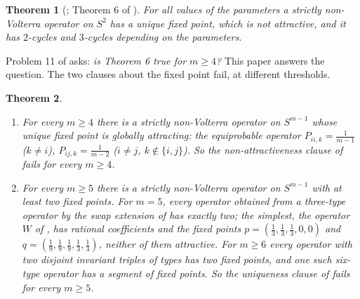 \documentclass[11pt]{amsart}
\newtheorem{theorem}{Theorem}[section]
\theoremstyle{definition}
\newcommand{\Simp}{S^{m-1}}
\begin{document}
\begin{theorem}[{\cite{RZ09}; Theorem 6 of \cite{GR09}}]\label{thm:six}
For all values of the parameters a strictly non-Volterra operator on $S^2$ has a unique fixed point, which is not attractive, and it has $2$-cycles and $3$-cycles depending on the parameters.
\end{theorem}

Problem 11 of \cite{GR09} asks: \emph{is Theorem 6 true for $m\ge4$?} This paper answers the question. The two clauses about the fixed point fail, at different thresholds.

\begin{theorem}\label{thm:main}
\leavevmode
\begin{enumerate}
\item[(i)] For every $m\ge4$ there is a strictly non-Volterra operator on $\Simp$ whose unique fixed point is globally attracting: the equiprobable operator $P_{ii,k}=\frac1{m-1}$ ($k\ne i$), $P_{ij,k}=\frac1{m-2}$ ($i\ne j$, $k\notin\{i,j\}$). So the non-attractiveness clause of  fails for every $m\ge4$.
\item[(ii)] For every $m\ge5$ there is a strictly non-Volterra operator on $\Simp$ with at least two fixed points. For $m=5$, every operator obtained from a three-type operator by the swap extension of  has exactly two; the simplest, the operator $W$ of , has rational coefficients and the fixed points $p=(\frac13,\frac13,\frac13,0,0)$ and $q=(\frac19,\frac19,\frac19,\frac13,\frac13)$, neither of them attractive. For $m\ge6$ every operator with two disjoint invariant triples of types has two fixed points, and one such six-type operator has a segment of fixed points. So the uniqueness clause of  fails for every $m\ge5$.
\end{enumerate}
\end{theorem}
\end{document}
